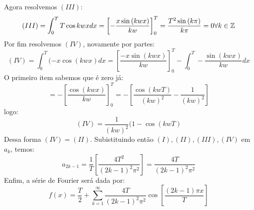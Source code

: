Agora resolvemos $(III)$:
\begin{equation*}
    (III) = \int^T_0 T\cos{kwx}dx = \left[-\frac{x\sin{(kwx)}}{kw}\right]^T_0 = \frac{T^2\sin{(k\pi)}}{k\pi} = 0\forall k \in \mathbb{Z}
\end{equation*}
Por fim resolvemos $(IV)$, novamente por partes:
\begin{equation*}
    (IV) = \int^T_0 (-x\cos{(kwx)}dx = \left[\frac{-x\sin{(kwx)}}{kw}\right]^T_0 - \int^T_0 -\frac{\sin{(kwx)}}{kw}dx
\end{equation*}
O primeiro item sabemos que é zero já:
\begin{equation*}
    = - \left[\frac{\cos{(kwx)}}{kw}\right]^T_0 = -\left[\frac{\cos{(kwT)}}{(kw)^2} - \frac{1}{(kw)^2}\right]
\end{equation*}
logo:
\begin{equation}
    (IV) = \frac{1}{(kw)^2}(1-\cos{(kwT)}
\end{equation}
Dessa forma $(IV) = (II)$. Subistituindo então $(I), (II), (III), (IV)$ em $a_k$, temos:
\begin{equation}
    a_{2k-1} = \frac{1}{T}\left[\frac{4T^2}{(2k-1)^2\pi^2}\right] = \frac{4T}{(2k-1)^2\pi^2}
\end{equation}
Enfim, a série de Fourier será dada por:
\begin{equation}
    \label{eq:sf5c}
    \boxed{f(x) = \frac{T}{2} + \sum^\infty_{k=1} \frac{4T}{(2k-1)^2\pi^2} \cos{\left[\frac{(2k-1)\pi x}{T}\right]}}
\end{equation}
